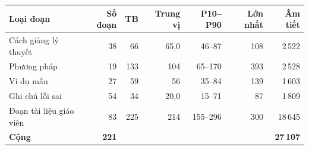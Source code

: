 \small
\begin{tabular}{@{}lrrrrrr@{}}
\toprule
Loại đoạn & Số đoạn & TB & Trung vị & P10--P90 & Lớn nhất & Âm tiết \\
\midrule
Cách giảng lý thuyết & 38 & 66 & 65,0 & 46--87 & 108 & 2\,522 \\
Phương pháp & 19 & 133 & 104 & 65--170 & 393 & 2\,528 \\
Ví dụ mẫu & 27 & 59 & 56 & 35--84 & 139 & 1\,603 \\
Ghi chú lỗi sai & 54 & 34 & 20,0 & 15--71 & 87 & 1\,809 \\
Đoạn tài liệu giáo viên & 83 & 225 & 214 & 155--296 & 300 & 18\,645 \\
\midrule
\textbf{Cộng} & \textbf{221} &  &  &  &  & \textbf{27\,107} \\
\bottomrule
\end{tabular}
